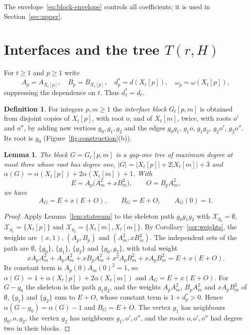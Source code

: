\documentclass[11pt]{amsart}
\newtheorem{lemma}[theorem]{Lemma}
\theoremstyle{definition}
\newtheorem{definition}[theorem]{Definition}
\theoremstyle{remark}
\numberwithin{equation}{section}
\newcommand{\cX}{\mathcal{X}}
\begin{document}
The envelope~\eqref{eq:block-envelope} controls all coefficients; it is used in Section~\ref{sec:upper}.

\section{Interfaces and the tree \texorpdfstring{$T(r,H)$}{T(r,H)}}\label{sec:tree}

For $t\ge1$ and $p\ge1$ write
\[
A_p=A_{X_t[p]},\quad B_p=B_{X_t[p]},\quad d_p^\ast=d(X_t[p]),\quad\omega_p=\omega(X_t[p]),
\]
suppressing the dependence on $t$. Thus $d_1^\ast=d_t$.

\begin{definition}\label{def:interface}
For integers $p,m\ge1$ the \emph{interface block} $G_t[p,m]$ is obtained from disjoint copies of $X_t[p]$, with root $o$, and of $X_t[m]$, twice, with roots $o'$ and $o''$, by adding new vertices $g_0,g_1,g_2$ and the edges $g_0g_1$, $g_1o$, $g_1g_2$, $g_2o'$, $g_2o''$. Its root is $g_0$ (Figure~\ref{fig:construction}(b)).
\end{definition}

\begin{lemma}\label{lem:interface}
The block $G=G_t[p,m]$ is a gap-one tree of maximum degree at most three whose root has degree one, $|G|=|X_t[p]|+2|X_t[m]|+3$ and $\alpha(G)=\alpha(X_t[p])+2\alpha(X_t[m])+1$. With
\[
E=A_p\bigl(A_m^2+xB_m^2\bigr),\qquad O=B_pA_m^2,
\]
we have
\begin{equation}\label{eq:interface}
A_G=E+x(E+O),\qquad B_G=E+O,\qquad A_G(0)=1.
\end{equation}
\end{lemma}

\begin{proof}
Apply Lemma~\ref{lem:statesum} to the skeleton path $g_0g_1g_2$ with $\cX_{g_0}=\emptyset$, $\cX_{g_1}=\{X_t[p]\}$ and $\cX_{g_2}=\{X_t[m],X_t[m]\}$. By Corollary~\ref{cor:weights}, the weights are $(x,1)$, $(A_p,B_p)$ and $(A_m^2,xB_m^2)$. The independent sets of the path are $\emptyset$, $\{g_0\}$, $\{g_1\}$, $\{g_2\}$ and $\{g_0,g_2\}$, with total weight
\[
xA_pA_m^2+A_pA_m^2+xB_pA_m^2+x^2A_pB_m^2+xA_pB_m^2=E+x(E+O).
\]
Its constant term is $A_p(0)A_m(0)^2=1$, so $\alpha(G)=1+\alpha(X_t[p])+2\alpha(X_t[m])$ and $A_G=E+x(E+O)$. For $G-g_0$ the skeleton is the path $g_1g_2$, and the weights $A_pA_m^2$, $B_pA_m^2$ and $xA_pB_m^2$ of $\emptyset$, $\{g_1\}$ and $\{g_2\}$ sum to $E+O$, whose constant term is $1+d_p^\ast>0$. Hence $\alpha(G-g_0)=\alpha(G)-1$ and $B_G=E+O$. The vertex $g_1$ has neighbours $g_0,o,g_2$, the vertex $g_2$ has neighbours $g_1,o',o''$, and the roots $o,o',o''$ had degree two in their blocks.
\end{proof}
\end{document}
